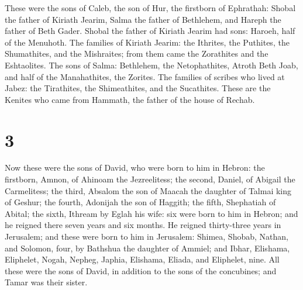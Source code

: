  These were the sons of Caleb, the son of Hur, the
firstborn of Ephrathah: Shobal the father of Kiriath Jearim,
 Salma the father of Bethlehem, and Hareph the father of
Beth Gader.  Shobal the father of Kiriath Jearim had
sons: Haroeh, half of the Menuhoth.  The families of
Kiriath Jearim: the Ithrites, the Puthites, the Shumathites, and the
Mishraites; from them came the Zorathites and the Eshtaolites.
 The sons of Salma: Bethlehem, the Netophathites, Atroth
Beth Joab, and half of the Manahathites, the Zorites. 
The families of scribes who lived at Jabez: the Tirathites, the
Shimeathites, and the Sucathites. These are the Kenites who came from
Hammath, the father of the house of Rechab.

\hypertarget{section-2}{%
\section{3}\label{section-2}}

 Now these were the sons of David, who were born to him in
Hebron: the firstborn, Amnon, of Ahinoam the Jezreelitess; the second,
Daniel, of Abigail the Carmelitess;  the third, Absalom
the son of Maacah the daughter of Talmai king of Geshur; the fourth,
Adonijah the son of Haggith;  the fifth, Shephatiah of
Abital; the sixth, Ithream by Eglah his wife:  six were
born to him in Hebron; and he reigned there seven years and six months.
He reigned thirty-three years in Jerusalem;  and these
were born to him in Jerusalem: Shimea, Shobab, Nathan, and Solomon,
four, by Bathshua the daughter of Ammiel;  and Ibhar,
Elishama, Eliphelet,  Nogah, Nepheg, Japhia,
 Elishama, Eliada, and Eliphelet, nine.  All
these were the sons of David, in addition to the sons of the concubines;
and Tamar was their sister.

